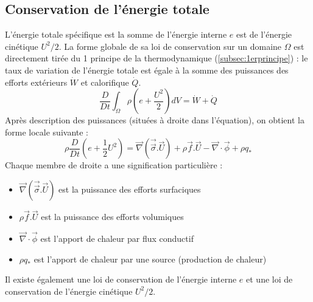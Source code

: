 \subsection{Conservation de l'énergie totale}
L'énergie totale spécifique est la somme de l'énergie interne $e$ est de l'énergie cinétique $U^2/2$. La forme globale de sa loi de conservation sur un domaine $\Omega$ est directement tirée du 1 principe de la thermodynamique (\ref{subsec:1erprincipe}) : le taux de variation de l'énergie totale est égale à la somme des puissances des efforts extérieurs $\dot{W}$ et calorifique $\dot{Q}$.
%
\begin{equation}
    \frac{D}{Dt} \int_{\Omega} \rho \left( e + \frac{U^2}{2} \right) dV = \dot{W} + \dot{Q}
\end{equation}
%
Après description des puissances (situées à droite dans l'équation), on obtient la forme locale suivante :
%
\begin{equation}
    \rho \frac{D}{Dt} \left( e + \frac{1}{2}U^2 \right)
    = \vec{\nabla} \left( \vec{\vec{\sigma}} . \vec{U} \right)
    + \rho \vec{f} . \vec{U}
    - \vec{\nabla} \cdot \vec{\phi}
    + \rho q_*
\end{equation}
%
Chaque membre de droite a une signification particulière :

\begin{itemize}
    \item $\vec{\nabla} \left( \vec{\vec{\sigma}} . \vec{U} \right)$ est la puissance des efforts surfaciques
    \item $\rho \vec{f} . \vec{U}$ est la puissance des efforts volumiques
    \item $\vec{\nabla} \cdot \vec{\phi}$ est l'apport de chaleur par flux conductif
    \item $\rho q_*$ est l'apport de chaleur par une source (production de chaleur)
\end{itemize}

Il existe également une loi de conservation de l'énergie interne $e$ et une loi de conservation de l'énergie cinétique $U^2/2$.
